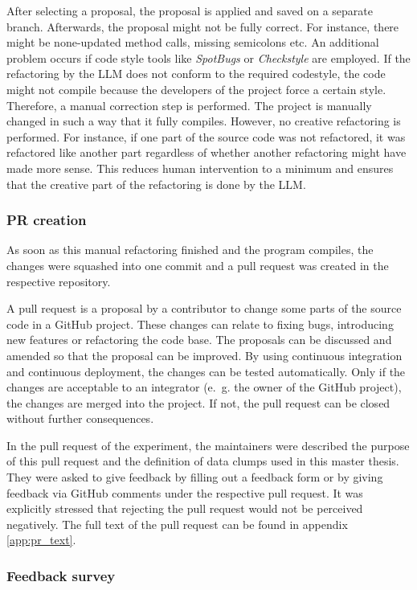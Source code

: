 After selecting a proposal, the proposal is applied and saved on a separate branch.
Afterwards, the proposal might not be fully correct. For instance, there might be  none-updated method calls, missing semicolons etc. An additional problem occurs if code style tools like \textit{SpotBugs} or \textit{Checkstyle} are employed. If the refactoring by the \ac{LLM} does not conform to the required codestyle, the code might not compile because the developers of the project force a certain style. Therefore, a manual correction step is performed. The project is  manually changed in such a way that it fully compiles. However, no creative refactoring is performed. For instance, if one part of the source code was not refactored, it was refactored like another part regardless of whether another refactoring might have made more sense. This reduces human intervention to a minimum and ensures that the creative part of the refactoring is done by the \ac{LLM}. 

\subsubsection{PR creation}
As soon as this manual refactoring finished and the program compiles, the changes were squashed into one commit and a pull request was created in the respective repository.

 A pull request is a proposal by a contributor to change some parts of the source code in a GitHub project. These changes can relate to fixing bugs, introducing new features or refactoring the code base. The proposals can be discussed and amended so that the proposal can be improved. By using continuous integration and continuous deployment, the changes can be tested automatically. Only if the changes are acceptable to an integrator (e.~g. the owner of the GitHub project), the changes are merged into the project. If not, the pull request can be closed without further consequences. \cite{pr_decisions}

In the pull request of the experiment, the maintainers were described the purpose of this pull request and  the definition of data clumps used in this master thesis. They were asked to give feedback by filling out a feedback form or by giving feedback via GitHub comments under the respective pull request. It was explicitly stressed that rejecting the pull request would not be perceived negatively. The full text of the pull request can be found in appendix \ref{app:pr_text}.

\subsubsection{Feedback survey}\label{sec:feedback_survey}

